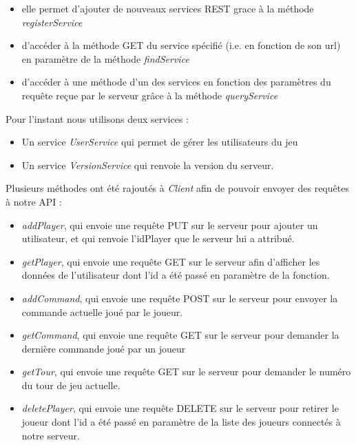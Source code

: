 \documentclass[a4paper,12pt]{article}
\begin{document}
\begin{itemize}
\item elle permet d'ajouter de nouveaux services REST grace à la méthode \emph{registerService}
\item d'accéder à la méthode GET du service spécifié (i.e. en fonction de son url) en paramètre de la méthode \emph{findService}
\item  d'accéder à une méthode d'un des services en fonction des paramètres du requête reçue par le serveur grâce à la méthode \emph{queryService}
\end{itemize}
    
    Pour l'instant nous utilisons deux services :
    
\begin{itemize}
\item Un service \emph{UserService} qui permet de gérer les utilisateurs du jeu
\item Un service \emph{VersionService} qui renvoie la version du serveur.
\end{itemize} 

    Plusieurs méthodes ont été rajoutés à \emph{Client} afin de pouvoir envoyer des requêtes à notre API : \begin{itemize}
        \item \emph{addPlayer}, qui envoie une requête PUT sur le serveur pour ajouter un utilisateur, et qui renvoie l'idPlayer que le serveur lui a attribué.
        \item \emph{getPlayer}, qui envoie une requête GET sur le serveur afin d'afficher les données de l'utilisateur dont l'id a été passé en paramètre de la fonction.
        \item \emph{addCommand}, qui envoie une requête POST sur le serveur pour envoyer la commande actuelle joué par le joueur.
        \item \emph{getCommand}, qui envoie une requête GET sur le serveur pour demander la dernière commande joué par un joueur
        \item \emph{getTour}, qui envoie une requête GET sur le serveur pour demander le numéro du tour de jeu actuelle.
        \item \emph{deletePlayer}, qui envoie une requête DELETE sur le serveur pour retirer le joueur dont l'id a été passé en paramètre de la liste des joueurs connectés à notre serveur.
    \end{itemize}
    
\end{document}
